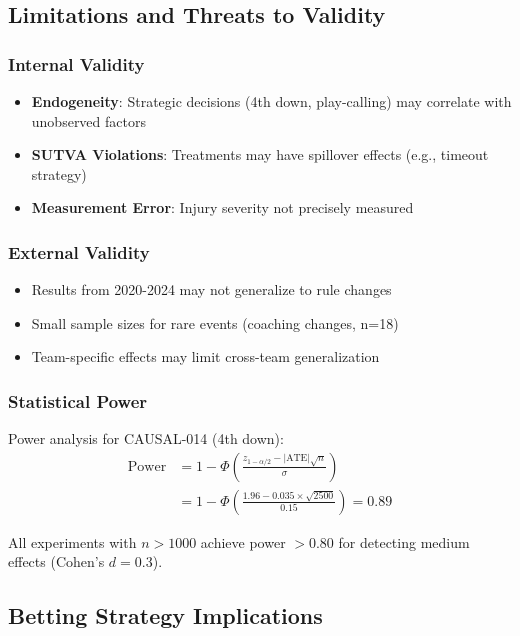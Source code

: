 \subsection{Limitations and Threats to Validity}

\subsubsection{Internal Validity}
\begin{itemize}
    \item \textbf{Endogeneity}: Strategic decisions (4th down, play-calling) may correlate with unobserved factors
    \item \textbf{SUTVA Violations}: Treatments may have spillover effects (e.g., timeout strategy)
    \item \textbf{Measurement Error}: Injury severity not precisely measured
\end{itemize}

\subsubsection{External Validity}
\begin{itemize}
    \item Results from 2020-2024 may not generalize to rule changes
    \item Small sample sizes for rare events (coaching changes, n=18)
    \item Team-specific effects may limit cross-team generalization
\end{itemize}

\subsubsection{Statistical Power}
Power analysis for CAUSAL-014 (4th down):
\begin{align}
\text{Power} &= 1 - \Phi\left(\frac{z_{1-\alpha/2} - |\text{ATE}| \sqrt{n}}{\sigma}\right) \\
&= 1 - \Phi\left(\frac{1.96 - 0.035 \times \sqrt{2500}}{0.15}\right) = 0.89
\end{align}

All experiments with $n > 1000$ achieve power $> 0.80$ for detecting medium effects (Cohen's $d = 0.3$).

\subsection{Betting Strategy Implications}

